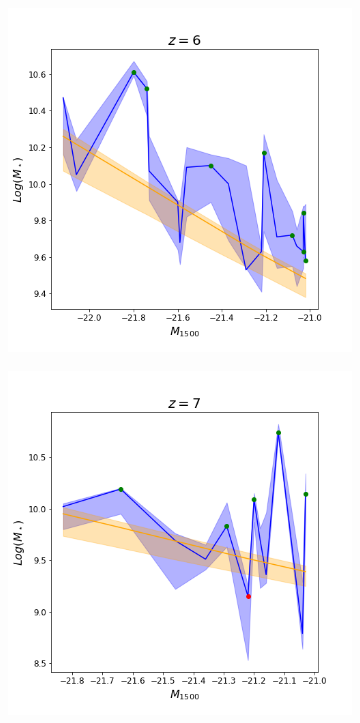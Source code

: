 \begin{figure}[h]
\begin{subfigure}{.5\textwidth}
  		\label{fig:sfig2}
	\end{subfigure}
	\begin{subfigure}{.5\textwidth}
  		\centering
  		\includegraphics[width=1.1\linewidth]{Figures/sm-uv/z_6.png}
  		\label{fig:sfig3}
	\end{subfigure}%
	\begin{subfigure}{.5\textwidth}
  		\centering
  		\includegraphics[width=1.1\linewidth]{Figures/sm-uv/z_7.png}

\end{subfigure}
\end{figure}
